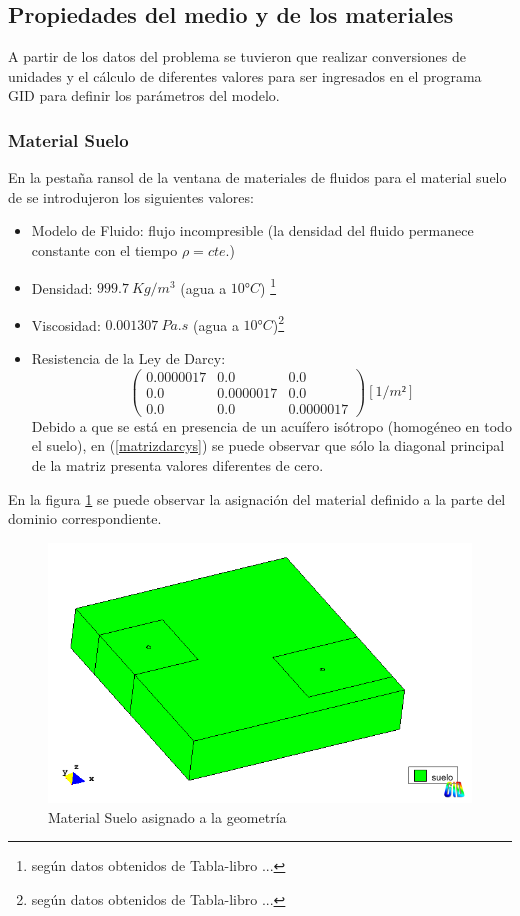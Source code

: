\documentclass[10pt,a4paper,final]{article}
\begin{document}
\subsection{Propiedades del medio y de los materiales}
A partir de los datos del problema se tuvieron que realizar conversiones de unidades y el cálculo de diferentes valores para ser ingresados en el programa GID para definir los parámetros del modelo.
\subsubsection{Material Suelo}
En la pestaña ransol de la ventana de materiales de fluidos para el material suelo de  se introdujeron los siguientes valores:
\begin{itemize}
\item Modelo de Fluido: flujo incompresible (la densidad del fluido permanece constante con el tiempo $\rho = cte.$)
\item Densidad: $999.7~Kg/m^3$ (agua a $10° C$) \footnote{ según datos obtenidos de Tabla-libro ...}
\item Viscosidad: $0.001307~Pa.s$ (agua a $10° C$)\footnote{ según datos obtenidos de Tabla-libro ...}
\item Resistencia de la Ley de Darcy:
\begin{equation}
\begin{pmatrix}{}
0.0000017 & 0.0 & 0.0 \\ 
0.0 & 0.0000017 & 0.0 \\ 
0.0 & 0.0 & 0.0000017
\end{pmatrix} [1/m²]
\label{matrizdarcys}
\end{equation}
Debido a que se está en presencia de un acuífero isótropo (homogéneo en todo el suelo), en (\ref{matrizdarcys}) se puede observar que sólo la diagonal principal de la matriz presenta valores diferentes de cero.
\end{itemize}
En la figura \ref{datos_materiales_suelo_vista} se puede observar la asignación del material definido a la parte del dominio correspondiente.

\begin{figure}[tbhp]
\centerline{\includegraphics[scale=0.75]{img/datos_materiales_suelo_vista}}
\caption{Material Suelo asignado a la geometría}
\label{datos_materiales_suelo_vista}
\end{figure}
\end{document}
